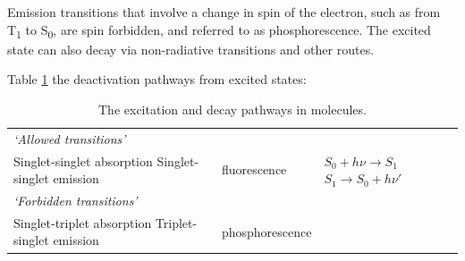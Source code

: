 \documentclass[
]{book}
\begin{document}
Emission transitions that involve a change in spin of the electron, such as from T\textsubscript{1} to S\textsubscript{0}, are spin forbidden, and referred to as phosphorescence. The excited state can also decay via non-radiative transitions and other routes.

Table \ref{tab:phototrans} the deactivation pathways from excited states:

\begin{longtable}[]{@{}lll@{}}
\caption{\label{tab:phototrans} The excitation and decay pathways in molecules.}\tabularnewline
\toprule
\endhead
\begin{minipage}[t]{0.39\columnwidth}\raggedright
\emph{`Allowed transitions'}\strut
\end{minipage} & \begin{minipage}[t]{0.26\columnwidth}\raggedright
\strut
\end{minipage} & \begin{minipage}[t]{0.26\columnwidth}\raggedright
\strut
\end{minipage}\tabularnewline
\begin{minipage}[t]{0.39\columnwidth}\raggedright
Singlet-singlet absorption Singlet-singlet emission\strut
\end{minipage} & \begin{minipage}[t]{0.26\columnwidth}\raggedright
fluorescence\strut
\end{minipage} & \begin{minipage}[t]{0.26\columnwidth}\raggedright
\(S_0 + h \nu \longrightarrow S_1\) \(S_1 \longrightarrow S_0 + h \nu '\)\strut
\end{minipage}\tabularnewline
\begin{minipage}[t]{0.39\columnwidth}\raggedright
\emph{`Forbidden transitions'}\strut
\end{minipage} & \begin{minipage}[t]{0.26\columnwidth}\raggedright
\strut
\end{minipage} & \begin{minipage}[t]{0.26\columnwidth}\raggedright
\strut
\end{minipage}\tabularnewline
\begin{minipage}[t]{0.39\columnwidth}\raggedright
Singlet-triplet absorption Triplet-singlet emission\strut
\end{minipage} & \begin{minipage}[t]{0.26\columnwidth}\raggedright
phosphorescence\strut
\end{minipage} & \begin{minipage}[t]{0.26\columnwidth}\raggedright

\end{minipage}
\end{longtable}
\end{document}
